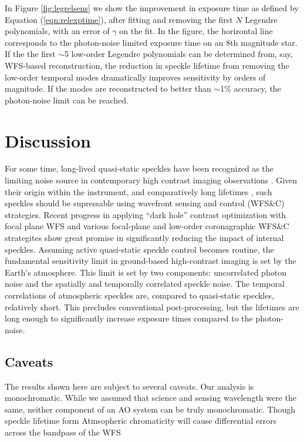 \documentclass[10pt,preprint]{aastex631}
\begin{document}
In Figure \ref{fig:legrelsens} we show the improvement in exposure time as defined by Equation (\ref{eqn:relexptime}), after fitting and removing the first $N$ Legendre polynomials, with an error of $\gamma$ on the fit.  In the figure, the horizontal line corresponds to the photon-noise limited exposure time on an 8th magnitude star.  If the the first $\sim$5 low-order Legendre polynomials can be determined from, say, WFS-based reconstruction, the reduction in speckle lifetime from removing the low-order temporal modes dramatically improves sensitivity by orders of magnitude.  If the modes are reconstructed to better than $\sim$1\% accuracy, the photon-noise limit can be reached.

\section{Discussion}
\label{sec:discussion}
For some time, long-lived quasi-static speckles have been recognized as the limiting noise source in contemporary high contrast imaging observations \citep[e.g.][]{2007ApJ...654..633H}.  Given their origin within the instrument, and comparatively long lifetimes \citep{2012A&A...541A.136M}, such speckles should be supressable using wavefront sensing and control (WFS\&C) strategies.  Recent progress in applying ``dark hole'' contrast optimization with focal plane WFS \citep{2020A&A...638A.117P} and various focal-plane \citep{2010A&A...509A..31G} and low-order coronagraphic WFS\&C strategites \citep[e.g.][]{2017PASP..129i5002S} show great promise in significantly reducing the impact of internal speckles.  Assuming active quasi-static speckle control becomes routine, the fundamental sensitivity limit in ground-based high-contrast imaging is set by the Earth's atmosphere.  This limit is set by two components: uncorrelated photon noise and the spatially and temporally correlated speckle noise.  The temporal correlations of atmospheric speckles are, compared to quasi-static speckles, relatively short. This precludes conventional post-processing, but the lifetimes are long enough to significantly increase exposure times compared to the photon-noise.

\subsection{Caveats}
The results shown here are subject to several caveats.  Our analysis is monochromatic. While we assumed that science and sensing wavelength were the same, neither component of an AO system can be truly monochromatic.  Though speckle lifetime form Atmsopheric chromaticity will cause differential errors across the bandpass of the WFS
\end{document}

